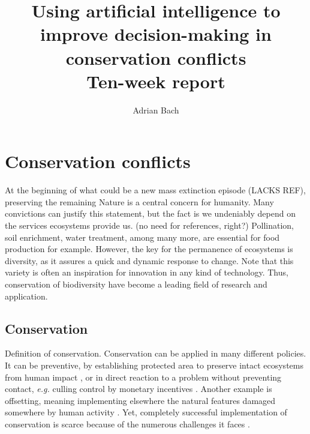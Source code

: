 \documentclass[12pt,a4paper]{article}
\author{Adrian Bach}
\title{Using artificial intelligence to improve decision-making in conservation conflicts \\\medskip Ten-week report}
\begin{document}
\maketitle

\tableofcontents

\newpage
\section{Conservation conflicts}

At the beginning of what could be a new mass extinction episode (LACKS REF), preserving the remaining Nature is a central concern for humanity.
Many convictions can justify this statement, but the fact is we undeniably depend on the services ecosystems provide us. (no need for references, right?)
Pollination, soil enrichment, water treatment, among many more, are essential for food production for example.
However, the key for the permanence of ecosystems is diversity, as it assures a quick and dynamic response to change.
Note that this variety is often an inspiration for innovation in any kind of technology.
Thus, conservation of biodiversity have become a leading field of research and application.
%

\subsection{Conservation}

Definition of conservation.
Conservation can be applied in many different policies.
It can be preventive, by establishing protected area to preserve intact ecosystems from human impact \citep{vanwilgen2011critical, brainbridge2017goose},
or in direct reaction to a problem without preventing contact, \textit{e.g.} culling control by monetary incentives \citep{mason2017changing, cusack2017time}.
Another example is offsetting, meaning implementing elsewhere the natural features damaged somewhere by human activity \citep{gordon2011assessing}.
Yet, completely successful implementation of conservation is scarce because of the numerous challenges it faces \citep{walters2011uncertainty, wilgen2011critical}.
\end{document}
